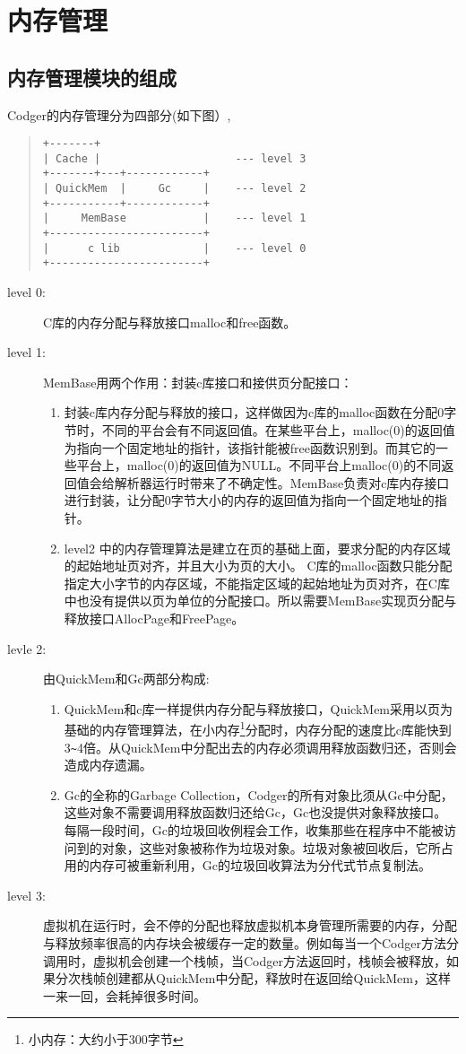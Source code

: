 \section{内存管理}
\subsection{内存管理模块的组成}
Codger的内存管理分为四部分(如下图）,
\begin{quote}
\begin{verbatim}
+-------+
| Cache |                     --- level 3
+-------+---+------------+ 
| QuickMem  |     Gc     |    --- level 2
+-----------+------------+
|     MemBase            |    --- level 1
+------------------------+
|      c lib             |    --- level 0
+------------------------+
\end{verbatim}
\end{quote}
\begin{description}
\item[level 0:] C库的内存分配与释放接口malloc和free函数。
\item[level 1:] MemBase用两个作用：封装c库接口和接供页分配接口：
\begin{enumerate}
\item 封装c库内存分配与释放的接口，这样做因为c库的malloc函数在分配0字节时，不同的平台会有不同返回值。在某些平台上，malloc(0)的返回值为指向一个固定地址的指针，该指针能被free函数识别到。而其它的一些平台上，malloc(0)的返回值为NULL。不同平台上malloc(0)的不同返回值会给解析器运行时带来了不确定性。MemBase负责对c库内存接口进行封装，让分配0字节大小的内存的返回值为指向一个固定地址的指针。
\item level2 中的内存管理算法是建立在页的基础上面，要求分配的内存区域的起始地址页对齐，并且大小为页的大小。 C库的malloc函数只能分配指定大小字节的内存区域，不能指定区域的起始地址为页对齐，在C库中也没有提供以页为单位的分配接口。所以需要MemBase实现页分配与释放接口AllocPage和FreePage。
\end{enumerate}
\item[levle 2:] 由QuickMem和Gc两部分构成:
\begin{enumerate}
\item QuickMem和c库一样提供内存分配与释放接口，QuickMem采用以页为基础的内存管理算法，在小内存\footnote{小内存：大约小于300字节}分配时，内存分配的速度比c库能快到3\verb|~|4倍。从QuickMem中分配出去的内存必须调用释放函数归还，否则会造成内存遗漏。
\item Gc的全称的Garbage Collection，Codger的所有对象比须从Gc中分配，这些对象不需要调用释放函数归还给Gc，Gc也没提供对象释放接口。每隔一段时间，Gc的垃圾回收例程会工作，收集那些在程序中不能被访问到的对象，这些对象被称作为垃圾对象。垃圾对象被回收后，它所占用的内存可被重新利用，Gc的垃圾回收算法为分代式节点复制法。
\end{enumerate}
\item[level 3:] 虚拟机在运行时，会不停的分配也释放虚拟机本身管理所需要的内存，分配与释放频率很高的内存块会被缓存一定的数量。例如每当一个Codger方法分调用时，虚拟机会创建一个栈帧，当Codger方法返回时，栈帧会被释放，如果分次栈帧创建都从QuickMem中分配，释放时在返回给QuickMem，这样一来一回，会耗掉很多时间。
\end{description}

